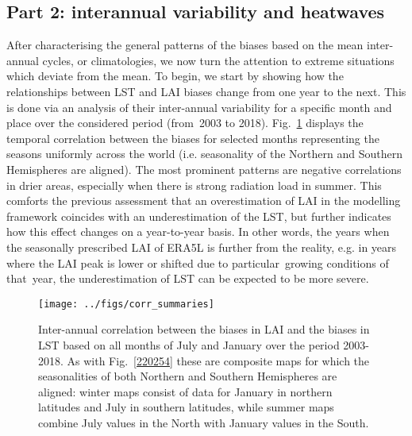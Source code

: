 \documentclass[gmd, manuscript]{copernicus}
\begin{document}
{\par\null\par\null

\subsection*{Part 2: interannual variability and
heatwaves}

{\label{296419}}

After characterising the general patterns of the biases based on the
mean inter-annual cycles, or climatologies, we now turn the attention to
extreme situations which deviate from the mean. To begin, we start by
showing how the relationships between LST and LAI biases change from one
year to the next. This {is done via an analysis of} their inter-annual
variability for a specific month and place over the considered period
(from~{2003} to 2018). Fig.~{\ref{891702}} displays the
temporal correlation between the biases for selected months representing
the seasons uniformly across the world (i.e. seasonality of the Northern
and Southern Hemispheres are aligned). The most prominent patterns are
negative correlations in drier areas, especially when there is strong
radiation load in summer. This comforts the previous assessment that an
overestimation of LAI in the modelling framework coincides with an
underestimation of the LST, but further indicates how this effect
changes on a year-to-year basis. In other words, the years when the
seasonally prescribed LAI of ERA5L is further from the reality, e.g. in
years where the LAI peak is lower or shifted due to particular~growing
conditions of that~year, the underestimation of LST can be expected to
be more severe.~

\par\null{}
\begin{figure}[H]
\begin{center}
\texttt{[image: ../figs/corr\_summaries]}
\caption{{Inter-annual correlation between the biases in LAI and the biases in LST
based on all months of July and January over the period 2003-2018. As
with Fig.~{\ref{220254}} these are composite maps for
which the seasonalities of both Northern and Southern Hemispheres are
aligned: winter maps consist of data for January in northern latitudes
and July in southern latitudes, while summer maps combine July values in
the North with January values in the South.~
{\label{891702}}%
}}
\end{center}
\end{figure}

}
\end{document}
